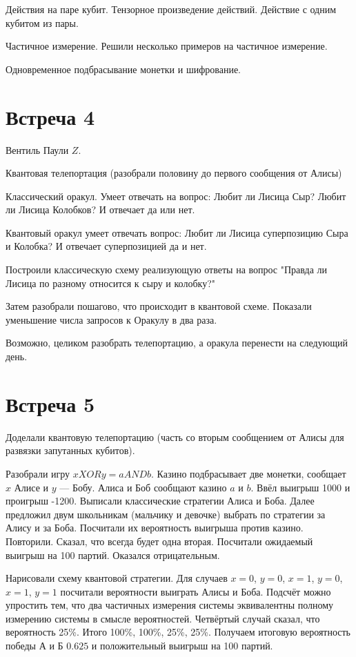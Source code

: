 \documentclass[12pt]{article}
\theoremstyle{definition}
\begin{document}
Действия на паре кубит. Тензорное произведение действий. Действие с одним кубитом из пары.

Частичное измерение. Решили несколько примеров на частичное измерение.

Одновременное подбрасывание монетки и шифрование.


\section{Встреча 4}

Вентиль Паули $Z$.

Квантовая телепортация (разобрали половину до первого сообщения от Алисы)

Классический оракул.
Умеет отвечать на вопрос: Любит ли Лисица Сыр? Любит ли Лисица Колобков?
И отвечает да или нет.

Квантовый оракул умеет отвечать вопрос: Любит ли Лисица суперпозицию Сыра и Колобка?
И отвечает суперпозицией да и нет.

Построили классическую схему реализующую ответы на вопрос "Правда ли Лисица по разному
относится к сыру и колобку?"

Затем разобрали пошагово, что происходит в квантовой схеме. Показали уменьшение числа запросов
к Оракулу в два раза.

Возможно, целиком разобрать телепортацию, а оракула перенести на следующий день.

\section{Встреча 5}

Доделали квантовую телепортацию (часть со вторым сообщением от Алисы для развязки запутанных кубитов).

Разобрали игру $x XOR y = a AND b$.
Казино подбрасывает две монетки, сообщает $x$ Алисе и $y$ — Бобу. Алиса и Боб сообщают казино $a$ и $b$.
Ввёл выигрыш 1000 и проигрыш -1200.
Выписали классические стратегии Алиса и Боба.
Далее предложил двум школьникам (мальчику и девочке) выбрать по стратегии за Алису и за Боба.
Посчитали их вероятность выигрыша против казино. Повторили. Сказал, что всегда будет одна вторая.
Посчитали ожидаемый выигрыш на 100 партий.
Оказался отрицательным.

Нарисовали схему квантовой стратегии. Для случаев $x=0$, $y=0$, $x=1$, $y=0$, $x=1$, $y=1$
посчитали вероятности выиграть Алисы и Боба. Подсчёт можно упростить тем, что два частичных измерения
системы эквивалентны полному измерению системы в смысле вероятностей.
Четвёртый случай сказал, что вероятность 25\%. Итого 100\%, 100\%, 25\%, 25\%.
Получаем итоговую вероятность победы А и Б $0.625$ и положительный выигрыш на 100 партий.
\end{document}
